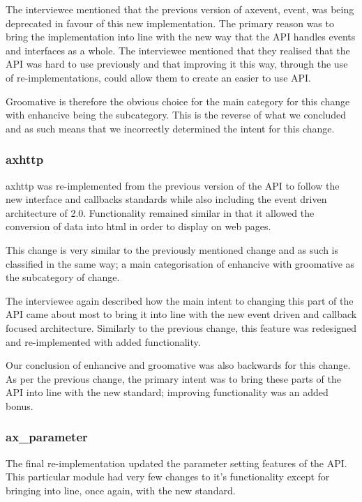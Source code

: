 \documentclass{sig-alternate}
\begin{document}
The interviewee mentioned that the previous version of axevent, event, was being deprecated in favour of this new implementation. The primary reason was to bring the implementation into line with the new way that the API handles events and interfaces as a whole. The interviewee mentioned that they realised that the API was hard to use previously and that improving it this way, through the use of re-implementations, could allow them to create an easier to use API.

Groomative is therefore the obvious choice for the main category for this change with enhancive being the subcategory. This is the reverse of what we concluded and as such means that we incorrectly determined the intent for this change.

\subsubsection{axhttp}

axhttp was re-implemented from the previous version of the API to follow the new interface and callbacks standards while also including the event driven architecture of 2.0. Functionality remained similar in that it allowed the conversion of data into html in order to display on web pages. 

This change is very similar to the previously mentioned change and as such is classified in the same way; a main categorisation of enhancive with groomative as the subcategory of change.

The interviewee again described how the main intent to changing this part of the API came about most to bring it into line with the new event driven and callback focused architecture. Similarly to the previous change, this feature was redesigned and re-implemented with added functionality.

Our conclusion of enhancive and groomative was also backwards for this change. As per the previous change, the primary intent was to bring these parts of the API into line with the new standard; improving functionality was an added bonus. 

\subsubsection{ax\_parameter}

The final re-implementation updated the parameter setting features of the API. This particular module had very few changes to it's functionality except for bringing into line, once again, with the new standard.
\end{document}
